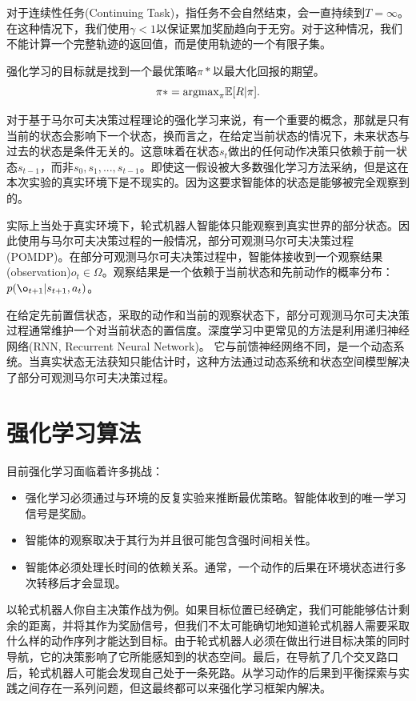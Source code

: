 对于连续性任务(Continuing Task)，指任务不会自然结束，会一直持续到$T = \infty$。在这种情况下，我们使用$\gamma < 1$以保证累加奖励趋向于无穷。对于这种情况，我们不能计算一个完整轨迹的返回值，而是使用轨迹的一个有限子集。

强化学习的目标就是找到一个最优策略$\pi*$以最大化回报的期望。
\begin{equation}
\pi* = \text{argmax}_\pi \Bbb{E}[R|\pi].
\end{equation}

对于基于马尔可夫决策过程理论的强化学习来说，有一个重要的概念，那就是只有当前的状态会影响下一个状态，换而言之，在给定当前状态的情况下，未来状态与过去的状态是条件无关的。这意味着在状态$s_t$做出的任何动作决策只依赖于前一状态$s_{t-1}$\cite{18}，而非${s_0, s_1, ..., s_{t-1}}$。即使这一假设被大多数强化学习方法采纳，但是这在本次实验的真实环境下是不现实的。因为这要求智能体的状态是能够被完全观察到的。

实际上当处于真实环境下，轮式机器人智能体只能观察到真实世界的部分状态。因此使用与马尔可夫决策过程的一般情况，部分可观测马尔可夫决策过程(POMDP)。在部分可观测马尔可夫决策过程中，智能体接收到一个观察结果(observation)$o_t \in \Omega$。观察结果是一个依赖于当前状态和先前动作的概率分布：$p(\o_{t+1}|s_{t+1},a_t)$。

在给定先前置信状态，采取的动作和当前的观察状态下，部分可观测马尔可夫决策过程通常维护一个对当前状态的置信度。深度学习中更常见的方法是利用递归神经网络(RNN, Recurrent Neural Network)。 它与前馈神经网络不同，是一个动态系统。当真实状态无法获知只能估计时，这种方法通过动态系统和状态空间模型解决了部分可观测马尔可夫决策过程。

\section{强化学习算法}
目前强化学习面临着许多挑战：
\begin{itemize}
  \item 强化学习必须通过与环境的反复实验来推断最优策略。智能体收到的唯一学习信号是奖励。
  \item 智能体的观察取决于其行为并且很可能包含强时间相关性。
  \item 智能体必须处理长时间的依赖关系。通常，一个动作的后果在环境状态进行多次转移后才会显现。
\end{itemize}

以轮式机器人你自主决策作战为例。如果目标位置已经确定，我们可能能够估计剩余的距离，并将其作为奖励信号，但我们不太可能确切地知道轮式机器人需要采取什么样的动作序列才能达到目标。由于轮式机器人必须在做出行进目标决策的同时导航，它的决策影响了它所能感知到的状态空间。最后，在导航了几个交叉路口后，轮式机器人可能会发现自己处于一条死路。从学习动作的后果到平衡探索与实践之间存在一系列问题，但这最终都可以来强化学习框架内解决。

